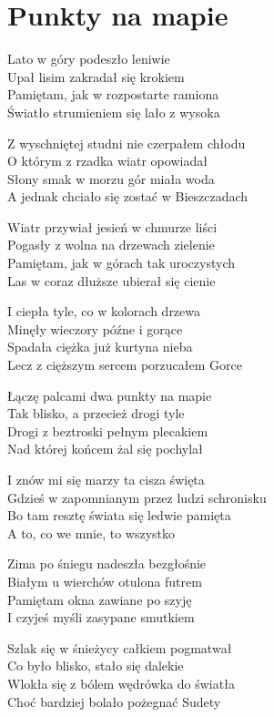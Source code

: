 \section{Punkty na mapie}
\begin{text}
Lato w góry podeszło leniwie\\
Upał lisim zakradał się krokiem\\
Pamiętam, jak w rozpostarte ramiona\\
Światło strumieniem się lało z wysoka

Z wyschniętej studni nie czerpałem chłodu\\
O którym z rzadka wiatr opowiadał\\
Słony smak w morzu gór miała woda\\
A jednak chciało się zostać w Bieszczadach

Wiatr przywiał jesień w chmurze liści\\
Pogasły z wolna na drzewach zielenie\\
Pamiętam, jak w górach tak uroczystych\\
Las w coraz dłuższe ubierał się cienie

I ciepła tyle, co w kolorach drzewa\\
Minęły wieczory późne i gorące\\
Spadała ciężka już kurtyna nieba\\
Lecz z cięższym sercem porzucałem Gorce

Łączę palcami dwa punkty na mapie\\
Tak blisko, a przecież drogi tyle\\
Drogi z beztroski pełnym plecakiem\\
Nad której końcem żal się pochylał

I znów mi się marzy ta cisza święta\\
Gdzieś w zapomnianym przez ludzi schronisku\\
Bo tam resztę świata się ledwie pamięta\\
A to, co we mnie, to wszystko

Zima po śniegu nadeszła bezgłośnie\\
Białym u wierchów otulona futrem\\
Pamiętam okna zawiane po szyję\\
I czyjeś myśli zasypane smutkiem

Szlak się w śnieżycy całkiem pogmatwał\\
Co było blisko, stało się dalekie\\
Wlokła się z bólem wędrówka do światła\\
Choć bardziej bolało pożegnać Sudety


\end{text}
